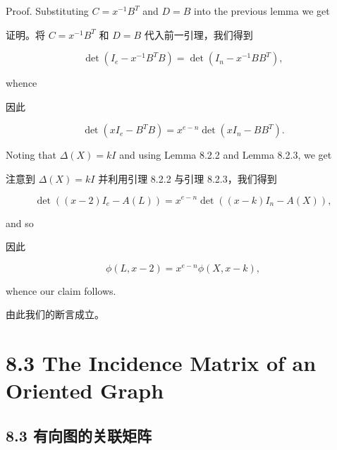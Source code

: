 \documentclass[10pt]{article}
\begin{document}
Proof. Substituting \(C = {x}^{-1}{B}^{T}\) and \(D = B\) into the previous lemma we get

\begin{tcolorbox}\relax
证明。将 \(C = {x}^{-1}{B}^{T}\) 和 \(D = B\) 代入前一引理，我们得到
\end{tcolorbox}

\[
\det \left( {{I}_{e} - {x}^{-1}{B}^{T}B}\right)  = \det \left( {{I}_{n} - {x}^{-1}B{B}^{T}}\right) ,
\]

whence

\begin{tcolorbox}\relax
因此
\end{tcolorbox}

\[
\det \left( {x{I}_{e} - {B}^{T}B}\right)  = {x}^{e - n}\det \left( {x{I}_{n} - B{B}^{T}}\right) .
\]

Noting that \(\Delta \left( X\right)  = {kI}\) and using Lemma 8.2.2 and Lemma 8.2.3, we get

\begin{tcolorbox}\relax
注意到 \(\Delta \left( X\right)  = {kI}\) 并利用引理 8.2.2 与引理 8.2.3，我们得到
\end{tcolorbox}

\[
\det \left( {\left( {x - 2}\right) {I}_{e} - A\left( L\right) }\right)  = {x}^{e - n}\det \left( {\left( {x - k}\right) {I}_{n} - A\left( X\right) }\right) ,
\]

and so

\begin{tcolorbox}\relax
因此
\end{tcolorbox}

\[
\phi \left( {L,x - 2}\right)  = {x}^{e - n}\phi \left( {X,x - k}\right) ,
\]

whence our claim follows.

\begin{tcolorbox}\relax
由此我们的断言成立。
\end{tcolorbox}

\section*{8.3 The Incidence Matrix of an Oriented Graph}

\begin{tcolorbox}\relax
\section*{8.3 有向图的关联矩阵}
\end{tcolorbox}
\end{document}
